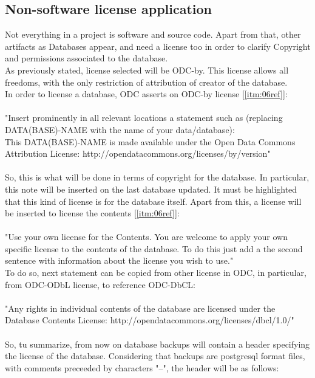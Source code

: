 \documentclass[11pt]{article}
\begin{document}
\subsection{Non-software license application}
Not everything in a project is software and source code. Apart from that, other artifacts as Databases appear, and need a license too in order to clarify Copyright and permissions associated to the database.\\
As previously stated, license selected will be ODC-by. This license allows all freedoms, with the only restriction of attribution of creator of the database.\\
In order to license a database, ODC asserts on ODC-by license [\ref{itm:06ref}]:\\
\\
"Insert prominently in all relevant locations a statement such as (replacing {DATA(BASE)-NAME} with the name of your data/database):\\
This {DATA(BASE)-NAME} is made available under the Open Data Commons Attribution License: http://opendatacommons.org/licenses/by/{version}"\\
\\
So, this is what will be done in terms of copyright for the database. In particular, this note will be inserted on the last database updated. It must be highlighted that this kind of license is for the database itself. Apart from this, a license will be inserted to license the contents [\ref{itm:06ref}]:\\
\\
"Use your own license for the Contents. You are welcome to apply your own specific license to the contents of the database. To do this just add a the second sentence with information about the license you wish to use."
\\
To do so, next statement can be copied from other license in ODC, in particular, from ODC-ODbL license, to reference ODC-DbCL:\\
\\
"Any rights in individual contents of the database are licensed under the Database Contents License: http://opendatacommons.org/licenses/dbcl/1.0/"\\
\\
So, tu summarize, from now on database backups will contain a header specifying the license of the database. Considering that backups are postgresql format files, with comments preceeded by characters "--", the header will be as follows:\\
\end{document}
